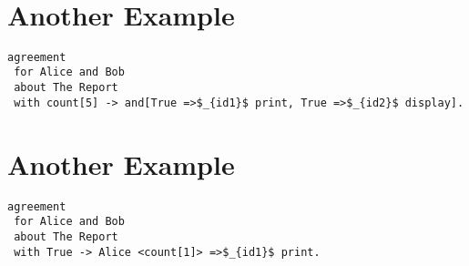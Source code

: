 \begin{minipage}[c]{0.95\textwidth}
\begin{lstlisting}


\end{lstlisting}
\end{minipage} 














\section {Another Example}
\lstset{language=Pucella2006}
\begin{minipage}[c]{0.95\textwidth}
\begin{lstlisting}[frame=single, caption={Agreement of Example 2.2},label={lst:pucellatwotwoexampleAST}, mathescape]
agreement
 for Alice and Bob 
 about The Report 
 with count[5] -> and[True =>$_{id1}$ print, True =>$_{id2}$ display].
\end{lstlisting}
\end{minipage} 
%
\section {Another Example}
\lstset{language=Pucella2006}
\begin{minipage}[c]{0.95\textwidth}
\begin{lstlisting}[frame=single, caption={Agreement of Example 2.3},label={lst:pucellatwothreeexampleAST}, mathescape]
agreement
 for Alice and Bob 
 about The Report 
 with True -> Alice <count[1]> =>$_{id1}$ print.
\end{lstlisting}
\end{minipage} 
%
